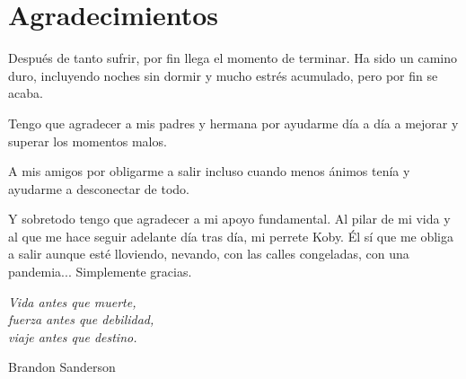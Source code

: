 \cleardoublepage

\chapter*{Agradecimientos}

Después de tanto sufrir, por fin llega el momento de terminar. Ha sido un camino duro, incluyendo noches sin dormir y mucho estrés acumulado, pero por fin se acaba.

  \vspace{3mm}

Tengo que agradecer a mis padres y hermana por ayudarme día a día a mejorar y superar los momentos malos.

  \vspace{3mm}

A mis amigos por obligarme a salir incluso cuando menos ánimos tenía y ayudarme a desconectar de todo.

  \vspace{3mm}

Y sobretodo tengo que agradecer a mi apoyo fundamental. Al pilar de mi vida y al que me hace seguir adelante día tras día, mi perrete Koby. Él sí que me obliga a salir aunque esté lloviendo, nevando, con las calles congeladas, con una pandemia...
Simplemente gracias.


\begin{flushright}
  \vspace{4.0 cm}
  \emph{Vida antes que muerte,\\
    fuerza antes que debilidad,\\
    viaje antes que destino.}\\
  \par
  
  \vspace{5mm}
  Brandon Sanderson\\
\end{flushright}


\thispagestyle{empty}

